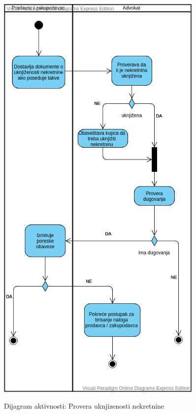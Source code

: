 \documentclass[20pt]{article}
\begin{document}
\begin{figure}[h]
		\centering
		\includegraphics[width=0.9\textwidth,height=0.6\textheight]{Pictures/DijagramAktivnostiProveraUknjizenosti.png}\\
		\caption{Dijagram aktivnosti: Provera uknjizenosti nekretnine}
		\label{fig:dijagramAktivnostiProveraUknjizenosti}
	\end{figure}
\newpage
\end{document}
